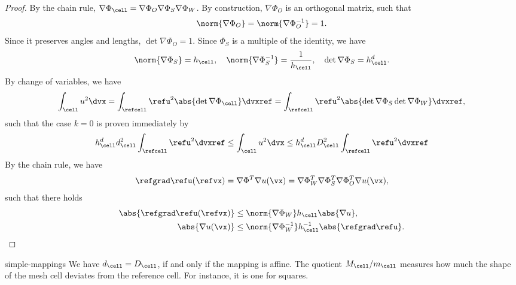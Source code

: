 \begin{proof}
  By the chain rule,
  $\nabla \Phi_{\cell} = \nabla \Phi_O \nabla \Phi_S \nabla \Phi_W$. By
  construction, $\nabla\Phi_O$ is an orthogonal matrix, such that
  \begin{gather*}
    \norm{\nabla\Phi_O} = \norm{\nabla\Phi_O^{-1}} = 1.
  \end{gather*}
  Since it preserves angles and lengths, $\det \nabla\Phi_O =
  1$. Since $\Phi_S$ is a multiple of the identity, we have
  \begin{gather*}
    \norm{\nabla\Phi_S} = h_\cell,
    \quad\norm{\nabla\Phi_S^{-1}} = \frac1{h_\cell},
    \quad\det\nabla\Phi_S = h_\cell^d.
  \end{gather*}
  By change of variables, we have
  \begin{gather*}
    \int_\cell u^2 \dvx
    = \int_{\refcell} \refu^2 \abs{\det\nabla\Phi_\cell} \dvxref
    = \int_{\refcell} \refu^2 \abs{\det\nabla\Phi_S\det\nabla\Phi_W} \dvxref
    ,
  \end{gather*}
  such that the case $k=0$ is proven immediately by
  \begin{gather*}
    h_{\cell}^d d_\cell^2 \int_{\refcell} \refu^2 \dvxref
    \le \int_\cell u^2 \dvx
    \le h_{\cell}^d D_\cell^2 \int_{\refcell} \refu^2 \dvxref
  \end{gather*}
  By the chain rule, we have
  \begin{gather*}
    \refgrad\refu(\refvx) = \nabla\Phi^T \nabla u(\vx)
    = \nabla\Phi_W^T \nabla\Phi_S^T \nabla\Phi_O^T \nabla u(\vx),
  \end{gather*}
  such that there holds
  \begin{gather}
    \begin{split}
      \abs{\refgrad\refu(\refvx)}
      &\le \norm{\nabla\Phi_W} h_\cell \abs{\nabla u},\\
      \abs{\nabla u(\vx)}
      &\le \norm{\nabla\Phi_W^{-1}} h_\cell^{-1} \abs{\refgrad \refu}.
    \end{split}
  \end{gather}
\end{proof}

\begin{Remark}{simple-mappings}
  We have $d_\cell = D_\cell$, if and only if the mapping is
  affine. The quotient $M_\cell/m_\cell$ measures how much the shape
  of the mesh cell deviates from the reference cell. For instance, it
  is one for squares.
\end{Remark}

